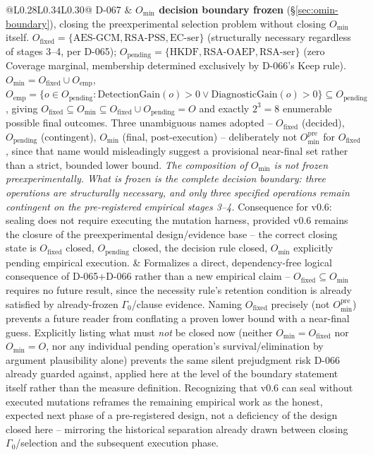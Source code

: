 \documentclass[11pt,a4paper]{article}
\begin{document}
\begin{longtable}{@{}L{0.28\textwidth}L{0.34\textwidth}L{0.30\textwidth}@{}}
D-067 & \textbf{$O_{\min}$ decision boundary frozen} (\S\ref{sec:omin-boundary}), closing the preexperimental selection problem without closing $O_{\min}$ itself. $O_{\text{fixed}} = \{\text{AES-GCM}, \text{RSA-PSS}, \text{EC-ser}\}$ (structurally necessary regardless of stages 3--4, per D-065); $O_{\text{pending}} = \{\text{HKDF}, \text{RSA-OAEP}, \text{RSA-ser}\}$ (zero Coverage marginal, membership determined exclusively by D-066's Keep rule). $O_{\min} = O_{\text{fixed}} \cup O_{\text{emp}}$, $O_{\text{emp}} = \{o\in O_{\text{pending}}: \text{DetectionGain}(o)>0\vee\text{DiagnosticGain}(o)>0\}\subseteq O_{\text{pending}}$, giving $O_{\text{fixed}}\subseteq O_{\min}\subseteq O_{\text{fixed}}\cup O_{\text{pending}}=O$ and exactly $2^3=8$ enumerable possible final outcomes. Three unambiguous names adopted -- $O_{\text{fixed}}$ (decided), $O_{\text{pending}}$ (contingent), $O_{\min}$ (final, post-execution) -- deliberately not $O_{\min}^{\text{pre}}$ for $O_{\text{fixed}}$, since that name would misleadingly suggest a provisional near-final set rather than a strict, bounded lower bound. \emph{The composition of $O_{\min}$ is not frozen preexperimentally. What is frozen is the complete decision boundary: three operations are structurally necessary, and only three specified operations remain contingent on the pre-registered empirical stages 3--4.} Consequence for v0.6: sealing does not require executing the mutation harness, provided v0.6 remains the closure of the preexperimental design/evidence base -- the correct closing state is $O_{\text{fixed}}$ closed, $O_{\text{pending}}$ closed, the decision rule closed, $O_{\min}$ explicitly pending empirical execution. & Formalizes a direct, dependency-free logical consequence of D-065+D-066 rather than a new empirical claim -- $O_{\text{fixed}}\subseteq O_{\min}$ requires no future result, since the necessity rule's retention condition is already satisfied by already-frozen $\Gamma_0$/clause evidence. Naming $O_{\text{fixed}}$ precisely (not $O_{\min}^{\text{pre}}$) prevents a future reader from conflating a proven lower bound with a near-final guess. Explicitly listing what must \emph{not} be closed now (neither $O_{\min}=O_{\text{fixed}}$ nor $O_{\min}=O$, nor any individual pending operation's survival/elimination by argument plausibility alone) prevents the same silent prejudgment risk D-066 already guarded against, applied here at the level of the boundary statement itself rather than the measure definition. Recognizing that v0.6 can seal without executed mutations reframes the remaining empirical work as the honest, expected next phase of a pre-registered design, not a deficiency of the design closed here -- mirroring the historical separation already drawn between closing $\Gamma_0$/selection and the subsequent execution phase.\\

\end{longtable}
\end{document}
